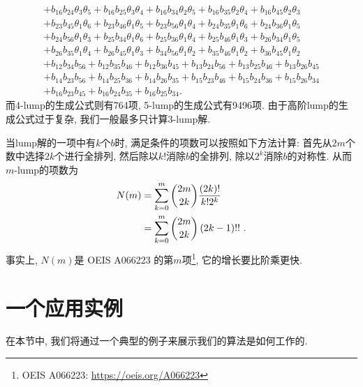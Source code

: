 \begin{equation}
\begin{array}{l}
+b_{{16}}b_{{24}}\theta_{{3}}\theta_{{5}}
+b_{{16}}b_{{25}}\theta_{{3}}\theta_{{4}}
+b_{{16}}b_{{34}}\theta_{{2}}\theta_{{5}}
+b_{{16}}b_{{35}}\theta_{{2}}\theta_{{4}}
+b_{{16}}b_{{45}}\theta_{{2}}\theta_{{3}}\\
+b_{{23}}b_{{45}}\theta_{{1}}\theta_{{6}}
+b_{{23}}b_{{46}}\theta_{{1}}\theta_{{5}}
+b_{{23}}b_{{56}}\theta_{{1}}\theta_{{4}}
+b_{{24}}b_{{35}}\theta_{{1}}\theta_{{6}}
+b_{{24}}b_{{36}}\theta_{{1}}\theta_{{5}}\\
+b_{{24}}b_{{56}}\theta_{{1}}\theta_{{3}}
+b_{{25}}b_{{34}}\theta_{{1}}\theta_{{6}}
+b_{{25}}b_{{36}}\theta_{{1}}\theta_{{4}}
+b_{{25}}b_{{46}}\theta_{{1}}\theta_{{3}}
+b_{{26}}b_{{34}}\theta_{{1}}\theta_{{5}}\\
+b_{{26}}b_{{35}}\theta_{{1}}\theta_{{4}}
+b_{{26}}b_{{45}}\theta_{{1}}\theta_{{3}}
+b_{{34}}b_{{56}}\theta_{{1}}\theta_{{2}}
+b_{{35}}b_{{46}}\theta_{{1}}\theta_{{2}}
+b_{{36}}b_{{45}}\theta_{{1}}\theta_{{2}}\\
+b_{{12}}b_{{34}}b_{{56}}
+b_{{12}}b_{{35}}b_{{46}}
+b_{{12}}b_{{36}}b_{{45}}
+b_{{13}}b_{{24}}b_{{56}}
+b_{{13}}b_{{25}}b_{{46}}
+b_{{13}}b_{{26}}b_{{45}}\\
+b_{{14}}b_{{23}}b_{{56}}
+b_{{14}}b_{{25}}b_{{36}}
+b_{{14}}b_{{26}}b_{{35}}
+b_{{15}}b_{{23}}b_{{46}}
+b_{{15}}b_{{24}}b_{{36}}
+b_{{15}}b_{{26}}b_{{34}}\\
+b_{{16}}b_{{23}}b_{{45}}
+b_{{16}}b_{{24}}b_{{35}}
+b_{{16}}b_{{25}}b_{{34}} .
\end{array}
\end{equation}
而4-lump的生成公式则有764项, 5-lump的生成公式有9496项. 由于高阶lump的生成公式过于复杂, 我们一般最多只计算3-lump解.

当lump解的一项中有$k$个$b$时, 满足条件的项数可以按照如下方法计算: 首先从$2m$个数中选择$2k$个进行全排列, 然后除以$k!$消除$b$的全排列, 除以$2^k$消除$b$的对称性. 从而$m$-lump的项数为
\begin{equation}
\begin{split}
N(m)&=\sum_{k=0}^{m}{\binom{2m}{2k}\frac{(2k)!}{k!2^k}} \\ 
&=\sum_{k=0}^m{\binom{2m}{2k}\left(2k-1\right)!!} ~.
\end{split}
\end{equation}
事实上, $N(m)$是 OEIS A066223 的第$m$项\footnote{OEIS A066223: \url{https://oeis.org/A066223}}, 它的增长要比阶乘更快. 

\section{一个应用实例}
在本节中, 我们将通过一个典型的例子来展示我们的算法是如何工作的.

